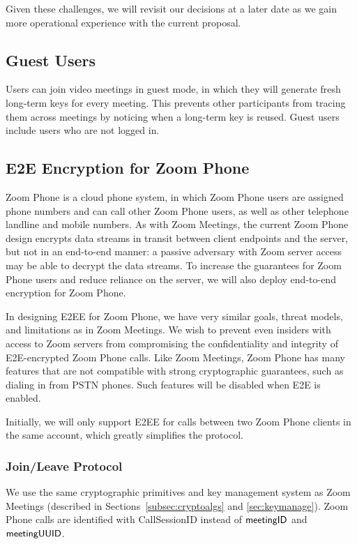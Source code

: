 Given these challenges, we will revisit our decisions at a later date as we gain more operational experience with the current proposal.

\subsection{Guest Users}
Users can join video meetings in guest mode, in which they will generate fresh long-term keys for every meeting. This prevents other participants from tracing them across meetings by noticing when a long-term key is reused. Guest users include users who are not logged in.

\subsection{E2E Encryption for Zoom Phone}\label{subsec:phone}

Zoom Phone is a cloud phone system, in which Zoom Phone users are assigned phone numbers and can call other Zoom Phone users, as well as other telephone landline and mobile numbers. As with Zoom Meetings, the current Zoom Phone design encrypts data streams in transit between client endpoints and the server, but not in an end-to-end manner: a passive adversary with Zoom server access may be able to decrypt the data streams. To increase the guarantees for Zoom Phone users and reduce reliance on the server, we will also deploy end-to-end encryption for Zoom Phone.

In designing E2EE for Zoom Phone, we have very similar goals, threat models, and limitations as in Zoom Meetings. We wish to prevent even insiders with access to Zoom servers from compromising the confidentiality and integrity of E2E-encrypted Zoom Phone calls. Like Zoom Meetings, Zoom Phone has many features that are not compatible with strong cryptographic guarantees, such as dialing in from PSTN phones. Such features will be disabled when E2E is enabled.

Initially, we will only support E2EE for calls between two Zoom Phone clients in the same account, which greatly simplifies the protocol.

\subsubsection{Join/Leave Protocol}

We use the same \sodium{} cryptographic primitives and key management system as Zoom Meetings (described in Sections~\ref{subsec:cryptoalgs} and \ref{sec:keymanage}).
Zoom Phone calls are identified with {\sf CallSessionID} instead of ${\sf meetingID}$ and ${\sf meetingUUID}$.

